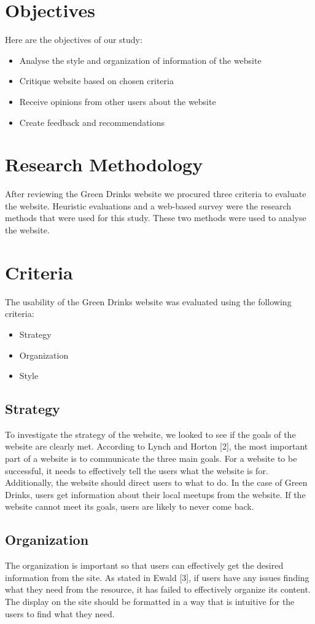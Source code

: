 \documentclass[12pt]{article}
\begin{document}
\section{Objectives}
Here are the objectives of our study:

\begin{itemize}
\item Analyse the style and organization of information of the website
\item Critique website based on chosen criteria
\item Receive opinions from other users about the website
\item Create feedback and recommendations
\end{itemize}
\section{Research Methodology}
After reviewing the Green Drinks website we procured three criteria to evaluate the website. Heuristic evaluations and a web-based survey were the research methods that were used for this study. These two methods were used to analyse the website.

\section{Criteria}
The usability of the Green Drinks website was evaluated using the following criteria:
\begin{itemize}
\item Strategy
\item Organization
\item Style
\end{itemize}
\subsection{Strategy}
To investigate the strategy of the website, we looked to see if the goals of the website are clearly met. According to Lynch and Horton [2], the most important part of a website is to communicate the three main goals. For a website to be successful, it needs to effectively tell the users what the website is for. Additionally, the website should direct users to what to do. In the case of Green Drinks, users get information about their local meetups from the website. If the website cannot meet its goals, users are likely to never come back.



\subsection{Organization}
The organization is important so that users can effectively get the desired information from the site. As stated in Ewald [3], if users have any issues finding what they need from the resource, it has failed to effectively organize its content. The display on the site should be formatted in a way that is intuitive for the users to find what they need.
\end{document}
